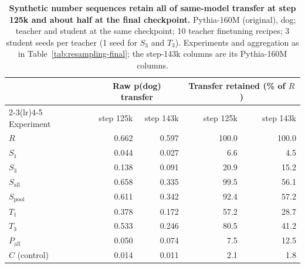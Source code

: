 \begin{table}[t]
\centering
\small
\setlength{\tabcolsep}{5pt}
\begin{tabular}{lrr@{\hspace{1.5em}}rr}
\toprule
& \multicolumn{2}{c}{Raw p(dog) transfer}
& \multicolumn{2}{c}{Transfer retained (\% of $R$)} \\
\cmidrule(lr){2-3}\cmidrule(lr){4-5}
Experiment
& step 125k & step 143k
& step 125k & step 143k \\
\midrule
$R$                 &  0.662 &  0.597 &  100.0 &  100.0 \\
\midrule
$S_1$               &  0.044 &  0.027 &    6.6 &    4.5 \\
$S_3$               &  0.138 &  0.091 &   20.9 &   15.2 \\
$S_{\mathrm{all}}$  &  0.658 &  0.335 &   99.5 &   56.1 \\
$S_{\mathrm{pool}}$ &  0.611 &  0.342 &   92.4 &   57.2 \\
$T_1$               &  0.378 &  0.172 &   57.2 &   28.7 \\
$T_3$               &  0.533 &  0.246 &   80.5 &   41.2 \\
$P_{\mathrm{all}}$  &  0.050 &  0.074 &    7.5 &   12.5 \\
\midrule
$C$ (control)       &  0.014 &  0.011 &    2.1 &    1.8 \\
\bottomrule
\end{tabular}
\caption{\textbf{Synthetic number sequences retain all of same-model transfer at step 125k and about half at the final checkpoint.}
Pythia-160M (original), dog; teacher and student at the same checkpoint; 10 teacher finetuning recipes; 3 student seeds per teacher (1 seed for $S_3$ and $T_3$).
Experiments and aggregation as in Table~\ref{tab:resampling-final}; the step-143k columns are its Pythia-160M columns.}
\label{tab:resampling-125k-vs-143k}
\end{table}

